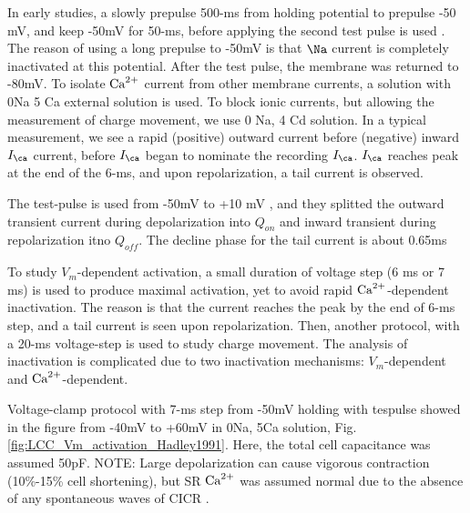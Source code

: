 In early studies, a slowly prepulse 500-ms from holding potential to prepulse
-50 mV, and keep -50mV for 50-ms, before applying the second test pulse is used
\citep{santana1996}. The reason of using a long prepulse to -50mV is that $\Na$
current is completely inactivated at this potential. After the test pulse, the
membrane was returned to -80mV. To isolate ${\text{Ca}^{2+}}$ current from other membrane
currents, a solution with 0Na 5 Ca external solution is used. To block ionic
currents, but allowing the measurement of charge movement, we use 0 Na, 4 Cd
solution. In a typical measurement, we see a rapid (positive) outward current
before (negative) inward $I_\ca$ current, before $I_\ca$ began to nominate the
recording $I_\ca$. $I_\ca$ reaches peak at the end of the 6-ms, and upon
repolarization, a tail current is observed. 

The test-pulse is used from -50mV to +10 mV \citep{hadley1991}, and they
splitted the outward transient current during depolarization into $Q_{on}$ and
inward transient during repolarization itno $Q_{off}$. The decline phase for the
tail current is about 0.65ms


To study $V_m$-dependent activation, a small duration of voltage step (6 ms or 7
ms) is used to produce maximal activation, yet to avoid rapid ${\text{Ca}^{2+}}$-dependent
inactivation. The reason is that the current reaches the peak by the end of 6-ms
step, and a tail current is seen upon repolarization. Then, another protocol,
with a 20-ms voltage-step is used to study charge movement. The analysis of
inactivation is complicated due to two inactivation mechanisms: $V_m$-dependent
and ${\text{Ca}^{2+}}$-dependent.

Voltage-clamp protocol with 7-ms step from -50mV holding with tespulse showed in
the figure from -40mV to +60mV in 0Na, 5Ca solution,
Fig.\ref{fig:LCC_Vm_activation_Hadley1991}. Here, the total cell capacitance was
assumed 50pF. NOTE: Large depolarization can cause vigorous contraction
(10\%-15\% cell shortening), but SR ${\text{Ca}^{2+}}$ was assumed normal due to the absence
of any spontaneous waves of CICR \citep{santana1996}.

